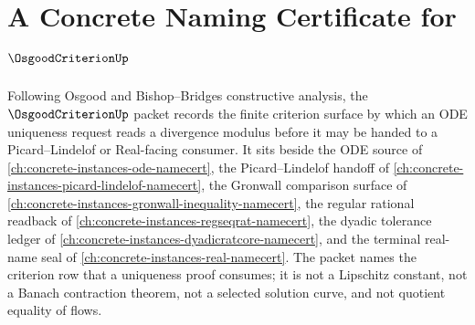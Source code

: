 \chapter{A Concrete Naming Certificate for $\OsgoodCriterionUp$}
\label{ch:concrete-instances-osgood-criterion-namecert}

Following Osgood and Bishop--Bridges constructive analysis, the $\OsgoodCriterionUp$ packet records the finite criterion surface by which an ODE uniqueness request reads a divergence modulus before it may be handed to a Picard--Lindelof or Real-facing consumer. It sits beside the ODE source of \autoref{ch:concrete-instances-ode-namecert}, the Picard--Lindelof handoff of \autoref{ch:concrete-instances-picard-lindelof-namecert}, the Gronwall comparison surface of \autoref{ch:concrete-instances-gronwall-inequality-namecert}, the regular rational readback of \autoref{ch:concrete-instances-regseqrat-namecert}, the dyadic tolerance ledger of \autoref{ch:concrete-instances-dyadicratcore-namecert}, and the terminal real-name seal of \autoref{ch:concrete-instances-real-namecert}. The packet names the criterion row that a uniqueness proof consumes; it is not a Lipschitz constant, not a Banach contraction theorem, not a selected solution curve, and not quotient equality of flows.

